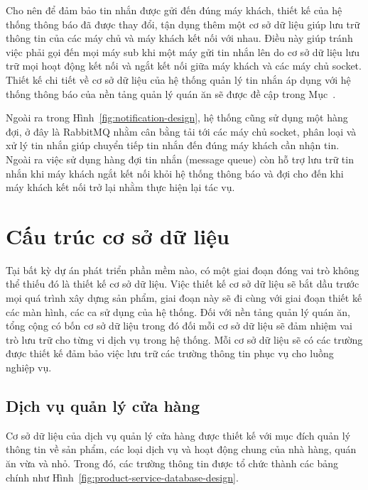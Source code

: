 Cho nên để đảm bảo tin nhắn được gửi đến đúng máy khách, thiết kế của hệ thống thông báo đã được thay đổi, tận dụng thêm một cơ sở dữ liệu giúp lưu trữ thông tin của các máy chủ và máy khách kết nối với nhau.
Điều này giúp tránh việc phải gọi đến mọi máy sub khi một máy gửi tin nhắn lên do cơ sở dữ liệu lưu trữ mọi hoạt động kết nối và ngắt kết nối giữa máy khách và các máy chủ socket.
Thiết kế chi tiết về cơ sở dữ liệu của hệ thống quản lý tin nhắn áp dụng với hệ thống thông báo của nền tảng quản lý quán ăn sẽ được đề cập trong Mục~.

Ngoài ra trong Hình~\ref{fig:notification-design}, hệ thống cũng sử dụng một hàng đợi, ở đây là RabbitMQ nhằm cân bằng tải tới các máy chủ socket, phân loại và xử lý tin nhắn giúp chuyển tiếp tin nhắn đến đúng máy khách cần nhận tin.
Ngoài ra việc sử dụng hàng đợi tin nhắn (message queue) còn hỗ trợ lưu trữ tin nhắn khi máy khách ngắt kết nối khỏi hệ thống thông báo và đợi cho đến khi máy khách kết nối trở lại nhằm thực hiện lại tác vụ.

\section{Cấu trúc cơ sở dữ liệu} \label{sec:database-design}
Tại bất kỳ dự án phát triển phần mềm nào, có một giai đoạn đóng vai trò không thể thiếu đó là thiết kế cơ sở dữ liệu.
Việc thiết kế cơ sở dữ liệu sẽ bắt dầu trước mọi quá trình xây dựng sản phẩm, giai đoạn này sẽ đi cùng với giai đoạn thiết kế các màn hình, các ca sử dụng của hệ thống.
Đối với nền tảng quản lý quán ăn, tổng cộng có bốn cơ sở dữ liệu trong đó đối mỗi cơ sở dữ liệu sẽ đảm nhiệm vai trò lưu trữ cho từng vi dịch vụ trong hệ thống.
Mỗi cơ sở dữ liệu sẽ có các trường được thiết kế đảm bảo việc lưu trữ các trường thông tin phục vụ cho luồng nghiệp vụ.
\subsection{Dịch vụ quản lý cửa hàng}
Cơ sở dữ liệu của dịch vụ quản lý cửa hàng được thiết kế với mục đích quản lý thông tin về sản phẩm, các loại dịch vụ và hoạt động chung của nhà hàng, quán ăn vừa và nhỏ.
Trong đó, các trường thông tin được tổ chức thành các bảng chính như Hình~\ref{fig:product-service-database-design}.

